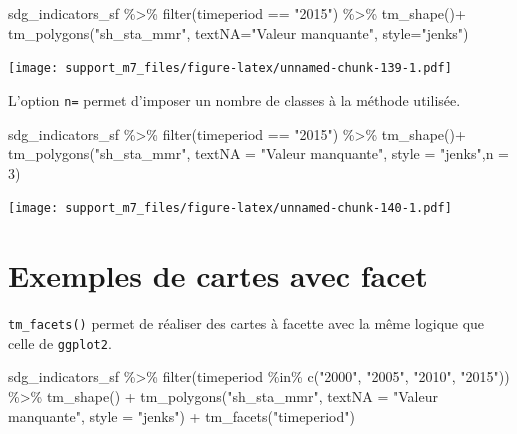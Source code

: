 \documentclass[
]{book}
\newenvironment{Shaded}{\begin{snugshade}}{\end{snugshade}}
\newcommand{\AttributeTok}[1]{\textcolor[rgb]{0.77,0.63,0.00}{#1}}
\newcommand{\DecValTok}[1]{\textcolor[rgb]{0.00,0.00,0.81}{#1}}
\newcommand{\FunctionTok}[1]{\textcolor[rgb]{0.00,0.00,0.00}{#1}}
\newcommand{\NormalTok}[1]{#1}
\newcommand{\SpecialCharTok}[1]{\textcolor[rgb]{0.00,0.00,0.00}{#1}}
\newcommand{\StringTok}[1]{\textcolor[rgb]{0.31,0.60,0.02}{#1}}
\begin{document}
\begin{Shaded}
\begin{Highlighting}[]
\NormalTok{sdg\_indicators\_sf }\SpecialCharTok{\%\textgreater{}\%} 
  \FunctionTok{filter}\NormalTok{(timeperiod }\SpecialCharTok{==} \StringTok{"2015"}\NormalTok{) }\SpecialCharTok{\%\textgreater{}\%} 
  \FunctionTok{tm\_shape}\NormalTok{()}\SpecialCharTok{+}
  \FunctionTok{tm\_polygons}\NormalTok{(}\StringTok{"sh\_sta\_mmr"}\NormalTok{, }\AttributeTok{textNA=}\StringTok{"Valeur manquante"}\NormalTok{, }\AttributeTok{style=}\StringTok{"jenks"}\NormalTok{)}
\end{Highlighting}
\end{Shaded}

\texttt{[image: support\_m7\_files/figure-latex/unnamed-chunk-139-1.pdf]}

L'option \texttt{n=} permet d'imposer un nombre de classes à la méthode utilisée.

\begin{Shaded}
\begin{Highlighting}[]
\NormalTok{sdg\_indicators\_sf }\SpecialCharTok{\%\textgreater{}\%} 
  \FunctionTok{filter}\NormalTok{(timeperiod }\SpecialCharTok{==} \StringTok{"2015"}\NormalTok{) }\SpecialCharTok{\%\textgreater{}\%} 
  \FunctionTok{tm\_shape}\NormalTok{()}\SpecialCharTok{+}
  \FunctionTok{tm\_polygons}\NormalTok{(}\StringTok{"sh\_sta\_mmr"}\NormalTok{, }\AttributeTok{textNA =} \StringTok{"Valeur manquante"}\NormalTok{, }\AttributeTok{style =} \StringTok{"jenks"}\NormalTok{,}\AttributeTok{n =} \DecValTok{3}\NormalTok{)}
\end{Highlighting}
\end{Shaded}

\texttt{[image: support\_m7\_files/figure-latex/unnamed-chunk-140-1.pdf]}

\hypertarget{exemples-de-cartes-avec-facet}{%
\section{Exemples de cartes avec facet}\label{exemples-de-cartes-avec-facet}}

\texttt{tm\_facets()} permet de réaliser des cartes à facette avec la même logique que celle de \texttt{ggplot2}.

\begin{Shaded}
\begin{Highlighting}[]
\NormalTok{sdg\_indicators\_sf }\SpecialCharTok{\%\textgreater{}\%}
  \FunctionTok{filter}\NormalTok{(timeperiod }\SpecialCharTok{\%in\%} \FunctionTok{c}\NormalTok{(}\StringTok{"2000"}\NormalTok{, }\StringTok{"2005"}\NormalTok{, }\StringTok{"2010"}\NormalTok{, }\StringTok{"2015"}\NormalTok{)) }\SpecialCharTok{\%\textgreater{}\%}
  \FunctionTok{tm\_shape}\NormalTok{() }\SpecialCharTok{+}
  \FunctionTok{tm\_polygons}\NormalTok{(}\StringTok{"sh\_sta\_mmr"}\NormalTok{, }\AttributeTok{textNA =} \StringTok{"Valeur manquante"}\NormalTok{, }\AttributeTok{style =} \StringTok{"jenks"}\NormalTok{) }\SpecialCharTok{+}
  \FunctionTok{tm\_facets}\NormalTok{(}\StringTok{"timeperiod"}\NormalTok{)}
\end{Highlighting}
\end{Shaded}
\end{document}
